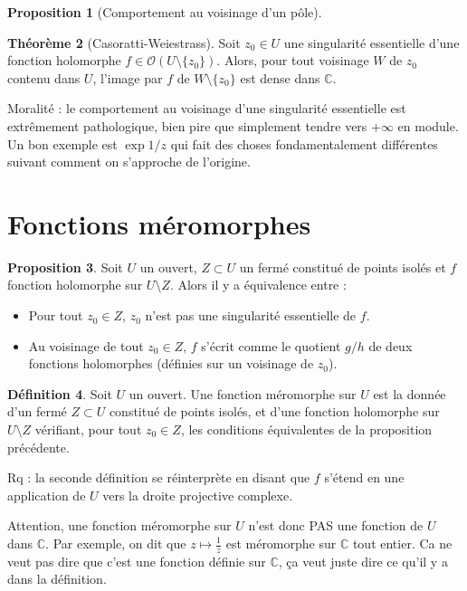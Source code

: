 \documentclass[11pt,a4paper]{book}
\newcommand{\C}{\mathbb{C}}
\theoremstyle{definition}
\newtheorem{theoreme}{Th\'eor\`eme}[section]
\newtheorem{proposition}[theoreme]{Proposition}
\newtheorem{definition}[theoreme]{D\'efinition}
\theoremstyle{plain}
\begin{document}
\begin{proposition}[Comportement au voisinage d'un pôle]
\end{proposition}

\begin{theoreme}[Casoratti-Weiestrass]
Soit $z_0 \in U$ une singularité essentielle d'une fonction holomorphe $f \in \mathcal O(U\setminus \{z_0\})$.
Alors, pour tout voisinage $W$ de $z_0$ contenu dans $U$, l'image par $f$ de $W\setminus\{z_0\}$ est dense dans $\C$.
\end{theoreme}

Moralité : le comportement au voisinage d'une singularité essentielle est extrêmement pathologique, bien pire que simplement tendre vers $+\infty$ en module. Un bon exemple est $\exp{1/z}$ qui fait des choses fondamentalement différentes suivant comment on s'approche de l'origine.

\section{Fonctions méromorphes}

\begin{proposition}
Soit $U$ un ouvert,  $Z\subset U$ un fermé constitué de points isolés et $f$ fonction holomorphe sur $U\setminus Z$.
Alors il y a équivalence entre :
\begin{itemize}
\item Pour tout $z_0\in Z$, $z_0$ n'est pas une singularité essentielle de $f$.
\item Au voisinage de tout $z_0\in Z$, $f$ s'écrit comme le quotient $g/h$ de deux fonctions holomorphes (définies sur un voisinage de $z_0$).
\end{itemize}
\end{proposition}

\begin{definition}
Soit $U$ un ouvert.
Une fonction méromorphe sur $U$ est la donnée d'un fermé $Z\subset U$ constitué de points isolés, et d'une fonction holomorphe sur $U\setminus Z$ vérifiant, pour tout $z_0\in Z$, les conditions équivalentes de la proposition précédente.
\end{definition}

Rq : la seconde définition se réinterprète en disant que $f$ s'étend en une application  de $U$ vers la droite projective complexe.


Attention, une \og fonction méromorphe sur $U$\fg{} n'est donc PAS une fonction de $U$ dans $\C$. Par exemple, on dit que $z\mapsto \frac{1}{z}$ est méromorphe sur $\C$ tout entier.
Ca ne veut pas dire que c'est une fonction définie sur $\C$, ça veut juste dire ce qu'il y a dans la définition.
\end{document}
